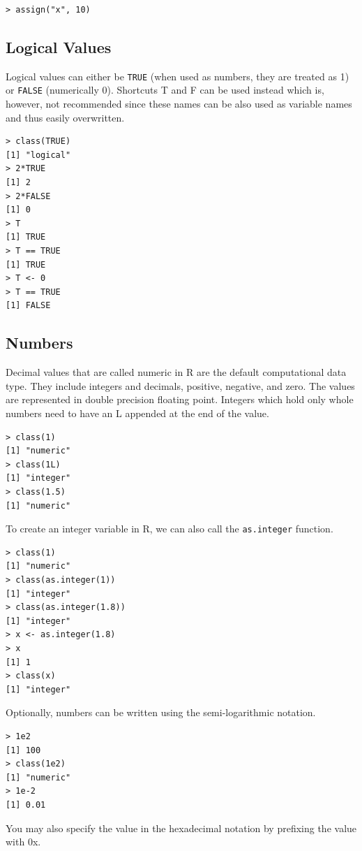 \begin{verbatim}
> assign("x", 10)
\end{verbatim}

\subsection{Logical Values}

Logical values can either be \texttt{TRUE} (when used as numbers, they are treated as
1) or \texttt{FALSE} (numerically 0). Shortcuts T and F can be used instead which is,
however, not recommended since these names can be also used as variable names
and thus easily overwritten.

\begin{verbatim}
> class(TRUE)
[1] "logical"
> 2*TRUE
[1] 2
> 2*FALSE
[1] 0
> T
[1] TRUE
> T == TRUE
[1] TRUE
> T <- 0
> T == TRUE
[1] FALSE
\end{verbatim}

\subsection{Numbers}

Decimal values that are called numeric in R are the default computational data
type. They include integers and decimals, positive, negative, and zero. The values are represented in double precision floating point. Integers which hold only
whole numbers need to have an L appended at the end of the value.

\begin{verbatim}
> class(1)
[1] "numeric"
> class(1L)
[1] "integer"
> class(1.5)
[1] "numeric"
\end{verbatim}

To create an integer variable in R, we can also call the \texttt{as.integer} function.

\begin{verbatim}
> class(1)
[1] "numeric"
> class(as.integer(1))
[1] "integer"
> class(as.integer(1.8))
[1] "integer"
> x <- as.integer(1.8)
> x
[1] 1
> class(x)
[1] "integer"
\end{verbatim}

Optionally, numbers can be written using the semi-logarithmic notation.

\begin{verbatim}
> 1e2
[1] 100
> class(1e2)
[1] "numeric"
> 1e-2
[1] 0.01
\end{verbatim}

You may also specify the value in the hexadecimal notation by prefixing the
value with 0x.

